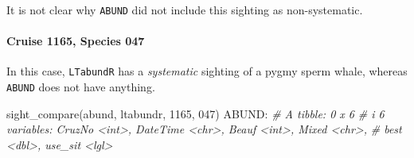 \documentclass[
]{book}
\newenvironment{Shaded}{\begin{snugshade}}{\end{snugshade}}
\newcommand{\CommentTok}[1]{\textcolor[rgb]{0.56,0.35,0.01}{\textit{#1}}}
\newcommand{\DecValTok}[1]{\textcolor[rgb]{0.00,0.00,0.81}{#1}}
\newcommand{\FunctionTok}[1]{\textcolor[rgb]{0.00,0.00,0.00}{#1}}
\newcommand{\NormalTok}[1]{#1}
\newcommand{\SpecialCharTok}[1]{\textcolor[rgb]{0.00,0.00,0.00}{#1}}
\newcommand{\StringTok}[1]{\textcolor[rgb]{0.31,0.60,0.02}{#1}}
\begin{document}
It is not clear why \texttt{ABUND} did not include this sighting as non-systematic.

\hypertarget{cruise-1165-species-047}{%
\paragraph*{Cruise 1165, Species 047}\label{cruise-1165-species-047}}

In this case, \texttt{LTabundR} has a \emph{systematic} sighting of a pygmy sperm whale, whereas \texttt{ABUND} does not have anything.

\begin{Shaded}
\begin{Highlighting}[]
\FunctionTok{sight\_compare}\NormalTok{(abund, ltabundr, }\DecValTok{1165}\NormalTok{, }\StringTok{\textquotesingle{}047\textquotesingle{}}\NormalTok{)}
\NormalTok{ABUND}\SpecialCharTok{:}
\CommentTok{\# A tibble: 0 x 6}
\CommentTok{\# i 6 variables: CruzNo \textless{}int\textgreater{}, DateTime \textless{}chr\textgreater{}, Beauf \textless{}int\textgreater{}, Mixed \textless{}chr\textgreater{},}
\CommentTok{\#   best \textless{}dbl\textgreater{}, use\_sit \textless{}lgl\textgreater{}}


\end{Highlighting}
\end{Shaded}
\end{document}
